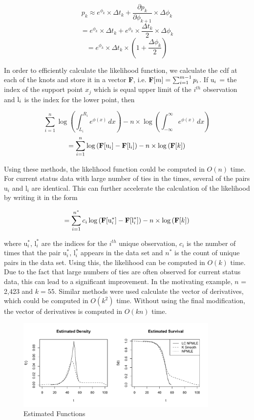 \documentclass[12pt]{article}
\numberwithin{equation}{section}
\begin{document}
	\[ p_k \approx e^{\phi_k} \times \Delta t_k + \frac{\partial p_k}{\partial \phi_{k+1}} \times \Delta \phi_k 
	\]
	\[
	= e^{\phi_k} \times \Delta t_k + e^{\phi_k} \times \frac {\Delta t_k} {2} \times \Delta \phi_k
	\]
	\[
	= e^{\phi_k} \times \Delta t_k \times \left(1 + \frac{\Delta \phi_k}{2} \right)
	\]

	In order to efficiently calculate the likelihood function, we calculate the cdf at each of the knots and store it in a vector {\bf F}, i.e. $ {\bf F}[m] = \sum_{i=1}^{m-1} p_i$. If $ {\text u}_i$ = the index of the support point $x_j$ which is equal upper limit of the $i^{th}$ observation and ${\text l}_i$ is the index for the lower point, then 

	\[ \displaystyle \sum_{i = 1}^n \log \left( \int_{L_i}^{R_i} e^ { \phi(x) } \,dx \right) - n \times \log \left(  \int_{-\infty}^{\infty} e^ { \phi(x) } \,dx \right) 
	\]
	\[=  \displaystyle \sum_{i = 1}^n \log \left({\bf F} [\text{u}_i] - {\bf F} [\text{l}_i] \right) - n \times \log \left(  {\bf F}[k] \right) 
	\]
	
	Using these methods, the likelihood function could be computed in $O(n)$ time. For current status data with large number of ties in the times, several of the pairs $\text{u}_i$ and $\text{l}_i$ are identical. This can further accelerate the calculation of the likelihood by writing it in the form 
	
	\[=  \displaystyle \sum_{i = 1}^{n^*} c_i\log \left({\bf F} [\text{u}_i^*] - {\bf F} [\text{l}_i^*] \right) - n \times \log \left(  {\bf F}[k] \right) 
	\]

	where $\text{u}_i^*$, $\text{l}_i^*$ are the indices for the $i^{th}$ unique observation, $c_i$ is the number of times that the pair $\text{u}_i^*$, $\text{l}_i^*$ appears in the data set and $n^*$ is the count of unique pairs in the data set. Using this, the likelihood can be computed in $O(k)$ time. Due to the fact that large numbers of ties are often observed for current status data, this can lead to a significant improvement. In the motivating example, $n$ = 2,423 and $k = 55$.
		Similar methods were used calculate the vector of derivatives, which could be computed in $O(k^2)$ time. Without using the final modification, the vector of derivatives is computed in $O(kn)$ time. 
	

\begin{figure}[h]
\centerline{\includegraphics[width = 10cm]{FullMenoPlot.pdf}}
\caption{Estimated Functions}
\end{figure}		
\end{document}
